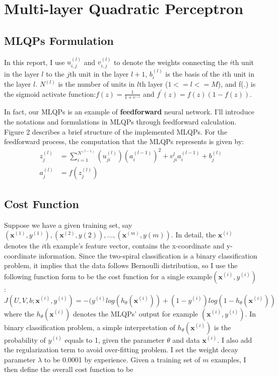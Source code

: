 \section{Multi-layer Quadratic Perceptron}
\subsection{MLQPs Formulation}
In this report, I use $u_{i,j}^{(l)}$ and $v_{i,j}^{(l)}$ to denote
the weights connecting the $i$th unit in the layer $l$ to the $j$th unit in the layer $l+1$, $b_{i}^{(l)}$ is the basis of the $i$th unit in the layer $l$. $N^{(l)}$ is the number of units in $l$th layer ($1<=l<=M$), and f(.) is the sigmoid activate function:$f(z)= \frac{1}{1+e^{-z}}$ and $f^{'}(z) = f(z)(1-f(z))$.

In fact, our MLQPs is an example of \textbf{feedforward} neural network. I'll introduce the notations and formulations in MLQPs through feedforward calculation. Figure 2 describes a brief structure of the implemented MLQPs. For the feedforward process, the computation that the MLQPs represents is given by:
\begin{equation}\label{unit}
\begin{split}
z_{j}^{(l)} &= \sum_{i=1}^{N^{(l-1)}}(u_{ji}^{(l)})(a_i^{(l-1)})^2+v_{ji}^{l}a_i^{(l-1)}+b_j^{(l)}
\\
a_{j}^{(l)} &= f(z_{j}^{(l)})
\end{split}
\end{equation}

\subsection{Cost Function}
Suppose we have a given training set, say {$(\mathbf{x}^{(1)},y^{(1)}),(\mathbf{x}^{(2)},y{(2)}),...,(\mathbf{x}^{(m)},y{(m)})$}.
In detail, the $\mathbf{x}^{(i)}$ denotes the $i$th example's feature vector, contains the x-coordinate and y-coordinate information.
Since the two-spiral classification is a binary classification problem, it implies that the data follows Bernoulli distribution, so I use the following function form to be the cost function for a single example$(\mathbf{x}^{(i)},y^{(i)})$:
\begin{equation}
J(U,V,b;\mathbf{x}^{(i)},y^{(i)}) = -(y^{(i)}log(h_\theta(\mathbf{x}^{(i)}))
+ (1-y^{(i)})log(1-h_\theta(\mathbf{x}^{(i)}))
\end{equation}
where the $h_\theta(\mathbf{x}^{(i)})$ denotes the MLQPs' output for example $(\mathbf{x}^{(i)},y^{(i)})$. In binary classification problem, a simple interpretation of  $h_\theta(\mathbf{x}^{(i)})$ is the probability of $y^{(i)}$ equals to 1, given the parameter $\theta$ and data $\mathbf{x}^{(i)}$. I also add the regularization term to avoid over-fitting problem. I set the weight decay parameter $\lambda$ to be 0.0001 by experience. Given a training set of $m$ examples, I then define the overall cost function to be


